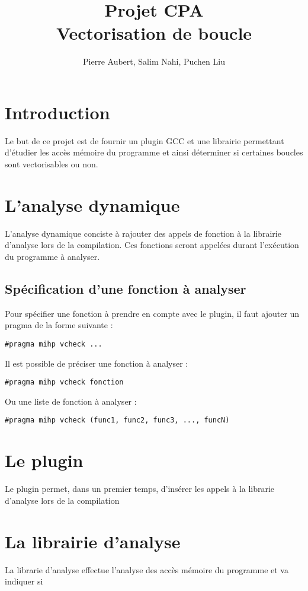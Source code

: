 \documentclass[12pt,french]{article}
\title{\color{blue}Projet CPA \\ Vectorisation de boucle}
\author{Pierre Aubert, Salim Nahi, Puchen Liu}
\begin{document}
\maketitle

\section*{\color{blue}Introduction}

Le but de ce projet est de fournir un plugin GCC et une librairie permettant d'étudier les accès mémoire du programme et ainsi déterminer si certaines boucles sont vectorisables ou non.

\section{\color{blue}L'analyse dynamique}

L'analyse dynamique conciste à rajouter des appels de fonction à la librairie d'analyse lors de la compilation. Ces fonctions seront appelées durant l'exécution du programme à analyser.

	\subsection{\color{blue}Spécification d'une fonction à analyser}

Pour spécifier une fonction à prendre en compte avec le plugin, il faut ajouter un pragma de la forme suivante :

\begin{center}
\color{green}
\begin{lstlisting}
#pragma mihp vcheck ...
\end{lstlisting}
\end{center}

Il est possible de préciser une fonction à analyser :

\begin{center}
\color{green}
\begin{lstlisting}
#pragma mihp vcheck fonction
\end{lstlisting}
\end{center}

Ou une liste de fonction à analyser :

\begin{center}
\color{green}
\begin{lstlisting}
#pragma mihp vcheck (func1, func2, func3, ..., funcN)
\end{lstlisting}
\end{center}



\section{\color{blue}Le plugin}

Le plugin permet, dans un premier temps,
d'insérer les appels à la librarie d'analyse lors de la compilation


\section{\color{blue}La librairie d'analyse}

La librarie d'analyse effectue l'analyse des accès mémoire du programme et va indiquer si 
\end{document}
